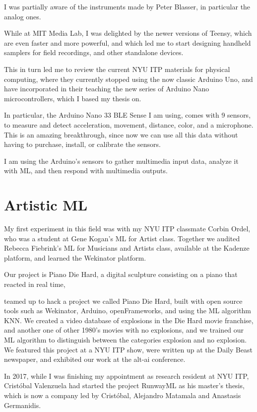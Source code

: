 I was partially aware of the instruments made by Peter Blasser, in particular the analog ones.

While at MIT Media Lab, I was delighted by the newer versions of Teensy, which are even faster and more powerful, and which led me to start designing handheld samplers for field recordings, and other standalone devices.

This in turn led me to review the current \acrshort{NYU} \acrshort{ITP} materials for physical computing, where they currently stopped using the now classic Arduino Uno, and have incorporated in their teaching the new series of Arduino Nano microcontrollers, which I based my thesis on.

In particular, the Arduino Nano 33 \acrshort{BLE} Sense I am using, comes with 9 sensors, to measure and detect acceleration, movement, distance, color, and a microphone. This is an amazing breakthrough, since now we can use all this data without having to purchase, install, or calibrate the sensors.

I am using the Arduino's sensors to gather multimedia input data, analyze it with \acrshort{ML}, and then respond with multimedia outputs.

\section{Artistic ML}

My first experiment in this field was with my \acrshort{NYU} \acrshort{ITP} classmate Corbin Ordel, who was a student at Gene Kogan's \acrshort{ML} for Artist class. Together we audited Rebecca Fiebrink's \acrshort{ML} for Musicians and Artists class, available at the Kadenze platform, and learned the Wekinator platform.

Our project is Piano Die Hard, a digital sculpture consisting on a piano that reacted in real time, 


teamed up to hack a project we called Piano Die Hard, built with open source tools such as Wekinator, Arduino, openFrameworks, and using the \acrshort{ML} algorithm KNN. We created a video database of explosions in the Die Hard movie franchise, and another one of other 1980's movies with no explosions, and we trained our \acrshort{ML} algorithm to distinguish between the categories explosion and no explosion. We featured this project at a \acrshort{NYU} \acrshort{ITP} show, were written up at the Daily Beast newspaper, and exhibited our work at the alt-ai conference.

In 2017, while I was finishing my appointment as research resident at \acrshort{NYU} ITP, Cristóbal Valenzuela had started the project RunwayML as his master's thesis, which is now a company led by Cristóbal, Alejandro Matamala and Anastasis Germanidis.

